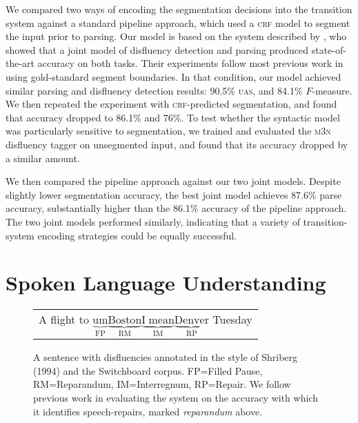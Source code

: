 \documentclass[11pt,letterpaper]{article}
\begin{document}
We compared two ways of encoding the segmentation decisions into the transition
system against a standard pipeline approach, which used a \textsc{crf} model
to segment the input prior to parsing.  Our model is based on the system described
by \citet{honnibal:14}, who showed that a joint model of disfluency detection
and parsing produced state-of-the-art accuracy on both tasks.
Their experiments follow most previous work in using gold-standard segment boundaries.
In that condition, our model achieved similar parsing and disfluency
detection results: 90.5\% \textsc{uas}, and 84.1\% $F$-measure.
We then repeated the experiment with \textsc{crf}-predicted segmentation,
and found that accuracy dropped to 86.1\% and 76\%.
To test whether the syntactic model was particularly sensitive to segmentation,
we trained and evaluated the \citet{qian:13} \textsc{m3n} disfluency tagger on
unsegmented input, and found that its accuracy dropped by a similar amount.

We then compared the pipeline approach against our two joint models.
Despite slightly lower segmentation accuracy,
the best joint
model achieves 87.6\% parse accuracy, substantially higher than the 86.1\%
accuracy of the pipeline approach.
The two joint models performed similarly, indicating that a variety of 
transition-system encoding strategies could be equally successful.


\section{Spoken Language Understanding}

\begin{figure}
    \begin{tabular}{l}

        A flight to $\underbrace{\mathrm{um}}_\text{FP} \underbrace{\mathrm{Boston}}_\text{RM} \underbrace{\mathrm{I\;mean}}_\text{IM} \underbrace{\mathrm{Denver}}_\text{RP}$ Tuesday\\

\end{tabular}
\caption{\small A sentence with disfluencies annotated in the style of Shriberg (1994) 
    and the Switchboard corpus.
FP=Filled Pause, RM=Reparandum, IM=Interregnum, RP=Repair.
We follow previous work in evaluating the system on the accuracy with which
it identifies speech-repairs, marked \emph{reparandum} above.
\label{fig:shriberg}}
\end{figure}


\end{document}
